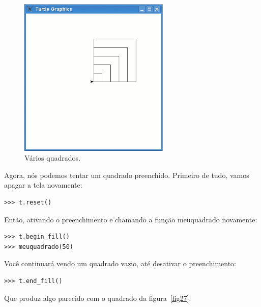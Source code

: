 {\begin{figure}
\begin{center}
\includegraphics[width=72mm]{eps/figure26.eps}
\end{center}
\caption{Vários quadrados.}\label{fig26}
\end{figure}

\noindent
Agora, nós podemos tentar um quadrado preenchido. Primeiro de tudo, vamos apagar a tela novamente:

\begin{listing}
\begin{verbatim}
>>> t.reset()
\end{verbatim}
\end{listing}

\noindent
Então, ativando o preenchimento e chamando a função meuquadrado novamente:

\begin{listing}
\begin{verbatim}
>>> t.begin_fill()
>>> meuquadrado(50)
\end{verbatim}
\end{listing}

\noindent
Você continuará vendo um quadrado vazio, até desativar o preenchimento:

\begin{listing}
\begin{verbatim}
>>> t.end_fill()
\end{verbatim}
\end{listing}

\noindent
Que produz algo parecido com o quadrado da figura~\ref{fig27}.

}
